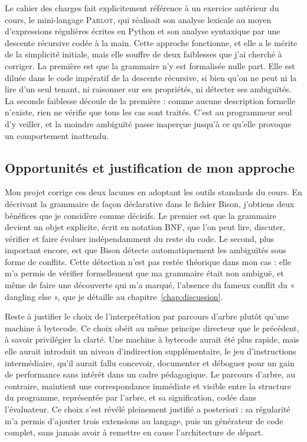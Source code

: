 Le cahier des charges fait explicitement référence à un exercice antérieur du
cours, le mini-langage \textsc{Parlot}, qui réalisait son analyse lexicale au
moyen d'expressions régulières écrites en Python et son analyse syntaxique par une
descente récursive codée à la main. Cette approche fonctionne, et elle a le mérite
de la simplicité initiale, mais elle souffre de deux faiblesses que j'ai cherché à
corriger. La première est que la grammaire n'y est formalisée nulle part. Elle est
diluée dans le code impératif de la descente récursive, si bien qu'on ne peut ni
la lire d'un seul tenant, ni raisonner sur ses propriétés, ni détecter ses
ambiguïtés. La seconde faiblesse découle de la première : comme aucune description
formelle n'existe, rien ne vérifie que tous les cas sont traités. C'est au
programmeur seul d'y veiller, et la moindre ambiguïté passe inaperçue jusqu'à ce
qu'elle provoque un comportement inattendu.

\subsection{Opportunités et justification de mon approche}

Mon projet corrige ces deux lacunes en adoptant les outils standards du cours. En
décrivant la grammaire de façon déclarative dans le fichier Bison, j'obtiens deux
bénéfices que je considère comme décisifs. Le premier est que la grammaire devient
un objet explicite, écrit en notation BNF, que l'on peut lire, discuter, vérifier
et faire évoluer indépendamment du reste du code. Le second, plus important
encore, est que Bison détecte automatiquement les ambiguïtés sous forme de
conflits. Cette détection n'est pas restée théorique dans mon cas : elle m'a
permis de vérifier formellement que ma grammaire était non ambiguë, et même de
faire une découverte qui m'a marqué, l'absence du fameux conflit du « dangling
else », que je détaille au chapitre~\ref{chap:discussion}.

Reste à justifier le choix de l'interprétation par parcours d'arbre plutôt qu'une
machine à bytecode. Ce choix obéit au même principe directeur que le précédent, à
savoir privilégier la clarté. Une machine à bytecode aurait été plus rapide, mais
elle aurait introduit un niveau d'indirection supplémentaire, le jeu
d'instructions intermédiaire, qu'il aurait fallu concevoir, documenter et déboguer
pour un gain de performance sans intérêt dans un cadre pédagogique. Le parcours
d'arbre, au contraire, maintient une correspondance immédiate et visible entre la
structure du programme, représentée par l'arbre, et sa signification, codée dans
l'évaluateur. Ce choix s'est révélé pleinement justifié a posteriori : sa
régularité m'a permis d'ajouter trois extensions au langage, puis un générateur de
code complet, sans jamais avoir à remettre en cause l'architecture de départ.
